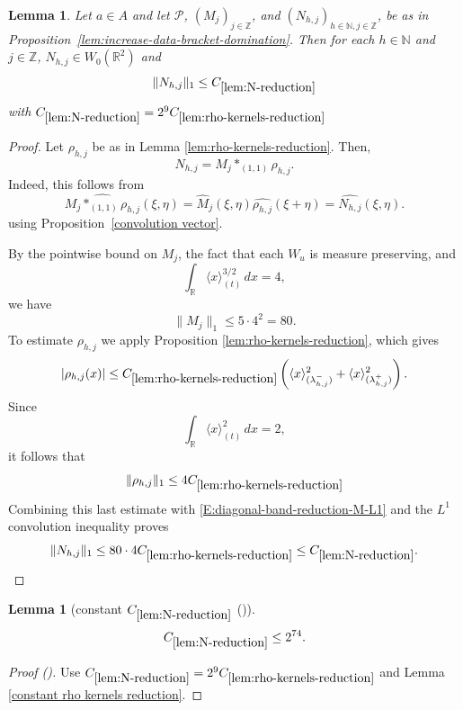 \documentclass[12pt,reqno]{amsart}
\newcommand{\auto}{{({\tiny\faCar})}}
\theoremstyle{plain}
\newtheorem{lemma}[theorem]{Lemma}
\numberwithin{equation}{section}
\theoremstyle{remark}
\newcommand{\using}[1]{}
\newcommand{\Z}{{\mathbb Z}}
\newcommand{\R}{{\mathbb R}}
\newcommand{\N}{{\mathbb N}}
\begin{document}
\begin{lemma}
\label{lem:N-reduction}\using{lem:rho-kernels-reduction}\using{convolution vector} Let $a\in A$ and let $\mathcal P$, $(M_j)_{j\in \Z}$, and $(N_{h,j})_{h\in \N,j\in \Z}$,  be as in Proposition~\ref{lem:increase-data-bracket-domination}.
Then for each $h\in \N$ and $j\in \Z$,   $N_{h,j}\in W_0(\R^2)$ and
\begin{equation}
    \label{E:diagonal-band-reduction-N-L1}
    \|N_{h,j}\|_1\leq  C_{\ref{lem:N-reduction}}
\end{equation}
with $C_{\ref{lem:N-reduction}} = 2^9C_{\ref{lem:rho-kernels-reduction}}$
\end{lemma}
\begin{proof}
Let \(\rho_{h,j}\) be as in Lemma \ref{lem:rho-kernels-reduction}.
Then,
\[
N_{h,j}=M_j\ast_{(1,1)}\rho_{h,j}.
\]
Indeed, this follows from
\[
\widehat{M_j\ast_{(1,1)}\rho_{h,j}}(\xi,\eta)
=
\widehat M_j(\xi,\eta)
\widehat{\rho_{h,j}}(\xi+\eta)
=
\widehat{N_{h,j}}(\xi,\eta).
\]
using Proposition~\ref{convolution vector}.


By the pointwise bound on \(M_j\), the fact that each
\(W_u\) is measure preserving, and
\[
\int_{\mathbb R}\langle x\rangle_{(t)}^{3/2}\,dx=4,
\]
we have
\begin{equation}
    \label{E:diagonal-band-reduction-M-L1}
    \|M_j\|_1
    \leq
    5\cdot 4^2
    =
    80.
\end{equation}
 To estimate  $\rho_{h,j}$  we   apply  Proposition \ref{lem:rho-kernels-reduction},
which gives
\[
|\rho_{h,j}(x)|
\leq
C_{\ref{lem:rho-kernels-reduction}}
\left(
\langle x\rangle_{(\lambda_{h,j}^-)}^2
+
\langle x\rangle_{(\lambda_{h,j}^+)}^2
\right).
\]
Since
\[
\int_{\mathbb R}\langle x\rangle_{(t)}^2\,dx=2,
\]
it follows that
\[
\|\rho_{h,j}\|_1
\leq
4C_{\ref{lem:rho-kernels-reduction}}
\]
Combining this last estimate with
\eqref{E:diagonal-band-reduction-M-L1} and the \(L^1\) convolution
inequality proves
\[
\|N_{h,j}\|_1
\leq
80\cdot 4 C_{\ref{lem:rho-kernels-reduction}}
\leq
C_{\ref{lem:N-reduction}}.
\]
\end{proof}

\begin{lemma}[constant $C_{\ref{lem:N-reduction}}$ \auto]\label{constant N reduction}\using{lem:N-reduction}\using{lem:rho-kernels-reduction}\using{constant rho kernels reduction}
\begin{equation}\label{constant N reduction bound}
C_{\ref{lem:N-reduction}}\le2^{74}.
\end{equation}
\end{lemma}
\begin{proof}[Proof \auto]
Use $C_{\ref{lem:N-reduction}}=2^9C_{\ref{lem:rho-kernels-reduction}}$ and Lemma \ref{constant rho kernels reduction}.
\end{proof}
\end{document}

